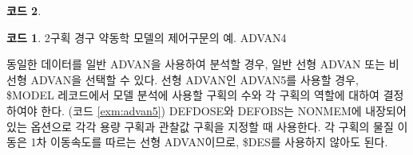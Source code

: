 \documentclass[
  10pt,
  krantz2,
  a4paper]{krantz}
\newenvironment{Shaded}{\begin{snugshade}}{\end{snugshade}}
\newcommand{\DecValTok}[1]{\textcolor[rgb]{0.00,0.00,0.81}{#1}}
\newcommand{\FloatTok}[1]{\textcolor[rgb]{0.00,0.00,0.81}{#1}}
\newcommand{\NormalTok}[1]{#1}
\newcommand{\OperatorTok}[1]{\textcolor[rgb]{0.81,0.36,0.00}{\textbf{#1}}}
\theoremstyle{definition}
\theoremstyle{definition}
\newtheorem{example}{코드}[chapter]
\theoremstyle{definition}
\theoremstyle{remark}
\begin{document}
\begin{Shaded}
\end{Shaded}

\begin{example}
\begin{example}

\protect\hypertarget{exm:advan4}{}{\label{exm:advan4} }2구획 경구 약동학 모델의 제어구문의 예. ADVAN4

\end{example}
\end{example}

동일한 데이터를 일반 ADVAN을 사용하여 분석할 경우, 일반 선형 ADVAN 또는 비선형 ADVAN을 선택할 수 있다. 선형 ADVAN인 ADVAN5를 사용할 경우, \$MODEL 레코드에서 모델 분석에 사용할 구획의 수와 각 구획의 역할에 대하여 결정하여야 한다. (코드 \ref{exm:advan5}) DEFDOSE와 DEFOBS는 NONMEM에 내장되어 있는 옵션으로 각각 용량 구획과 관찰값 구획을 지정할 때 사용한다. 각 구획의 물질 이동은 1차 이동속도를 따르는 선형 ADVAN이므로, \$DES를 사용하지 않아도 된다.
\end{document}
